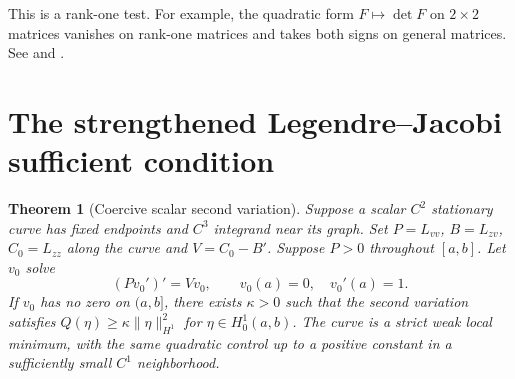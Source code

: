 \documentclass[11pt,oneside,openany]{book}
\theoremstyle{plain}
\newtheorem{theorem}{Theorem}[chapter]
\theoremstyle{definition}
\theoremstyle{remark}
\begin{document}
This is a rank-one test. For example, the quadratic form
\(F\mapsto\det F\) on \(2\times2\) matrices vanishes on rank-one
matrices and takes both signs on general matrices. See
\cite[Section 2.6.1]{Liberzon} and \cite[Sections 3.4--3.5]{Dacorogna}.

\section{The strengthened Legendre--Jacobi sufficient condition}
\label{v07-06}

\begin{theorem}[Coercive scalar second variation]
\label{thm:v07-06-01}
Suppose a scalar \(C^2\) stationary curve has fixed endpoints
and \(C^3\) integrand near its graph. Set \(P=L_{vv}\),
\(B=L_{zv}\), \(C_0=L_{zz}\) along the curve and \(V=C_0-B'\).
Suppose \(P>0\) throughout \([a,b]\). Let \(v_0\) solve
\[
 (Pv_0')'=Vv_0,\qquad v_0(a)=0,\quad v_0'(a)=1.
\]
If \(v_0\) has no zero on \((a,b]\), there exists \(\kappa>0\)
such that the second variation satisfies
\(Q(\eta)\ge\kappa\|\eta\|_{H^1}^2\) for \(\eta\in H^1_0(a,b)\).
The curve is a strict weak local minimum, with the same quadratic
control up to a positive constant in a sufficiently small
\(C^1\) neighborhood.
\end{theorem}
\end{document}
